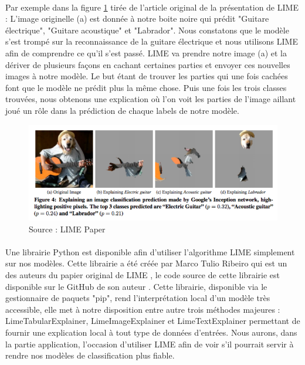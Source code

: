 \paragraph{}Par exemple dans la figure \ref{limeExemple} tirée de l'article original de la présentation de LIME\cite{limePaper} : L'image originelle (a) est donnée à notre boite noire qui prédit "Guitare électrique", "Guitare acoustique" et "Labrador". Nous constatons que le modèle s'est trompé sur la reconnaissance de la guitare électrique et nous utilisons LIME afin de comprendre ce qu'il s'est passé. LIME va prendre notre image (a) et la dériver de plusieurs façons en cachant certaines parties et envoyer ces nouvelles images à notre modèle. Le but étant de trouver les parties qui une fois cachées font que le modèle ne prédit plus la même chose. Puis une fois les trois classes trouvées, nous obtenons une explication où l'on voit les parties de l'image aillant joué un rôle dans la prédiction de chaque labels de notre modèle.
\begin{figure}[h]
\centering
\includegraphics[scale=0.35]{src_img/limeExemple.png}
\caption{Source : LIME Paper \cite{limePaper}}
\label{limeExemple}
\end{figure}
\paragraph{}Une librairie Python est disponible afin d'utiliser l'algorithme LIME simplement sur nos modèles. Cette librairie a été créée par Marco Tulio Ribeiro qui est un des auteurs du papier original de LIME \cite{limePaper}, le code source de cette librairie est disponible sur le GitHub de son auteur \cite{limeDepot}. Cette librairie, disponible via le gestionnaire de paquets "pip", rend l'interprétation local d'un modèle très accessible, elle met à notre disposition entre autre trois méthodes majeures : LimeTabularExplainer, LimeImageExplainer et LimeTextExplainer permettant de fournir une explication local à tout type de données d'entrées. Nous aurons, dans la partie application, l'occasion d'utiliser LIME afin de voir s'il pourrait servir à rendre nos modèles de classification plus fiable.


